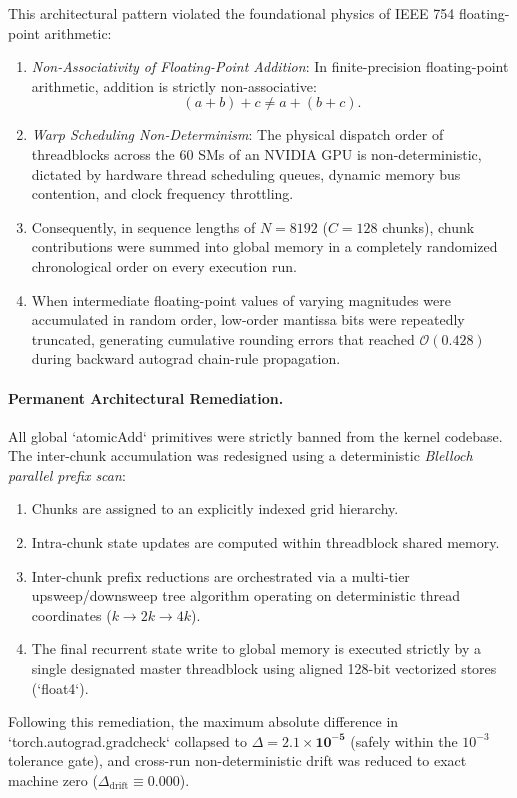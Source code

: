 This architectural pattern violated the foundational physics of IEEE 754 floating-point arithmetic:
\begin{enumerate}
    \item \emph{Non-Associativity of Floating-Point Addition}: In finite-precision floating-point arithmetic, addition is strictly non-associative:
    \begin{equation}
    (a + b) + c \ne a + (b + c).
    \end{equation}
    \item \emph{Warp Scheduling Non-Determinism}: The physical dispatch order of threadblocks across the 60 SMs of an NVIDIA GPU is non-deterministic, dictated by hardware thread scheduling queues, dynamic memory bus contention, and clock frequency throttling.
    \item Consequently, in sequence lengths of $N = 8192$ ($C = 128$ chunks), chunk contributions were summed into global memory in a completely randomized chronological order on every execution run.
    \item When intermediate floating-point values of varying magnitudes were accumulated in random order, low-order mantissa bits were repeatedly truncated, generating cumulative rounding errors that reached $\mathcal{O}(0.428)$ during backward autograd chain-rule propagation.
\end{enumerate}

\paragraph{Permanent Architectural Remediation.}
All global `atomicAdd` primitives were strictly banned from the kernel codebase. The inter-chunk accumulation was redesigned using a deterministic \emph{Blelloch parallel prefix scan}:
\begin{enumerate}
    \item Chunks are assigned to an explicitly indexed grid hierarchy.
    \item Intra-chunk state updates are computed within threadblock shared memory.
    \item Inter-chunk prefix reductions are orchestrated via a multi-tier upsweep/downsweep tree algorithm operating on deterministic thread coordinates ($k \to 2k \to 4k$).
    \item The final recurrent state write to global memory is executed strictly by a single designated master threadblock using aligned 128-bit vectorized stores (`float4`).
\end{enumerate}
Following this remediation, the maximum absolute difference in `torch.autograd.gradcheck` collapsed to $\Delta = \mathbf{2.1 \times 10^{-5}}$ (safely within the $10^{-3}$ tolerance gate), and cross-run non-deterministic drift was reduced to exact machine zero ($\Delta_{\text{drift}} \equiv 0.000$).

